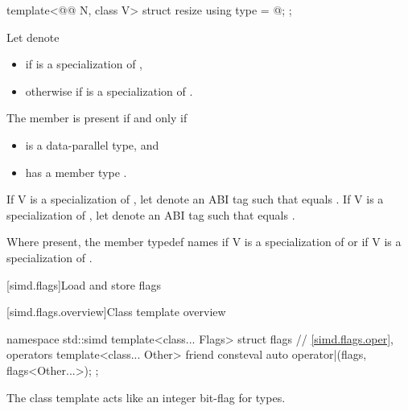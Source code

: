 \begin{itemdecl}
template<@@ N, class V> struct resize { using type = @\seebelow@; };
\end{itemdecl}

\begin{itemdescr}
\pnum
Let  denote
\begin{itemize}
 \item
    if  is a specialization of
   ,
 \item
   otherwise  if
    is a specialization of .
\end{itemize}

\pnum
The member  is present if and only if
\begin{itemize}
\item {} is a data-parallel type, and
\item {} has a member type .
\end{itemize}

\pnum
If \tcode V is a specialization of , let  denote an
ABI tag such that  equals .
If \tcode V is a specialization of , let 
denote an ABI tag such that  equals .

\pnum
Where present, the member typedef  names 
if \tcode V is a specialization of  or
 if \tcode V is a specialization of
.
\end{itemdescr}

[simd.flags]{Load and store flags}

[simd.flags.overview]{Class template  overview}

\begin{codeblock}
namespace std::simd {
  template<class... Flags> struct flags {
    // \ref{simd.flags.oper},  operators
    template<class... Other>
      friend consteval auto operator|(flags, flags<Other...>);
  };
}
\end{codeblock}

\pnum
\begin{note}
The class template  acts like an integer bit-flag for types.
\end{note}

